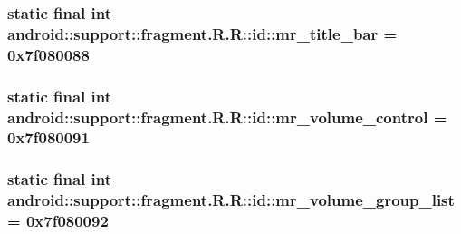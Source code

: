 \hypertarget{classandroid_1_1support_1_1fragment_1_1_r_1_1id_aa0ad5c6466e15b3ba34ff056573120e}{
\subsubsection[{mr\_\-title\_\-bar}]{\setlength{\rightskip}{0pt plus 5cm}static final int android::support::fragment.R.R::id::mr\_\-title\_\-bar = 0x7f080088}}
\label{classandroid_1_1support_1_1fragment_1_1_r_1_1id_aa0ad5c6466e15b3ba34ff056573120e}


\hypertarget{classandroid_1_1support_1_1fragment_1_1_r_1_1id_b35623d42d87d55e6acbf03c3e6e74aa}{
\subsubsection[{mr\_\-volume\_\-control}]{\setlength{\rightskip}{0pt plus 5cm}static final int android::support::fragment.R.R::id::mr\_\-volume\_\-control = 0x7f080091}}
\label{classandroid_1_1support_1_1fragment_1_1_r_1_1id_b35623d42d87d55e6acbf03c3e6e74aa}


\hypertarget{classandroid_1_1support_1_1fragment_1_1_r_1_1id_12621dea0324624f2cb392406a85cbe1}{
\subsubsection[{mr\_\-volume\_\-group\_\-list}]{\setlength{\rightskip}{0pt plus 5cm}static final int android::support::fragment.R.R::id::mr\_\-volume\_\-group\_\-list = 0x7f080092}}
\label{classandroid_1_1support_1_1fragment_1_1_r_1_1id_12621dea0324624f2cb392406a85cbe1}


